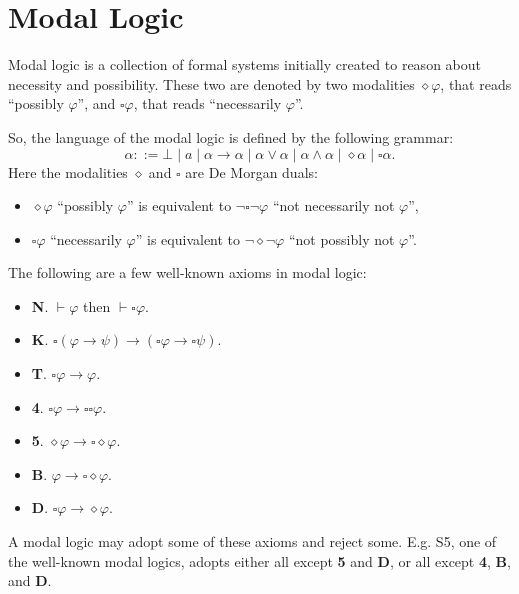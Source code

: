 \section{Modal Logic}

Modal logic is a collection of formal systems initially created to reason about necessity and possibility. These two are denoted by two modalities $\diamond\varphi$, that reads ``possibly $\varphi$'', and $\square\varphi$, that reads ``necessarily $\varphi$''.

So, the language of the modal logic is defined by the following grammar:
\[
\alpha ::= \bot \mid a \mid \alpha \rightarrow \alpha \mid \alpha \vee \alpha \mid \alpha \wedge \alpha \mid \diamond\alpha \mid \square\alpha.
\]
Here the modalities $\diamond$ and $\square$ are De Morgan duals:
\begin{itemize}
    \item $\diamond\varphi$ ``possibly $\varphi$'' is equivalent to $\neg\square\neg\varphi$ ``not necessarily not $\varphi$'',
    \item $\square\varphi$ ``necessarily $\varphi$'' is equivalent to $\neg\diamond\neg\varphi$ ``not possibly not $\varphi$''.
\end{itemize}

The following are a few well-known axioms in modal logic:
\begin{itemize}
    \item \textbf{N}. $\vdash \varphi$ then $\vdash \square\varphi$.
    \item \textbf{K}. $\square(\varphi \rightarrow \psi) \rightarrow (\square\varphi \rightarrow \square\psi)$.
    \item \textbf{T}. $\square\varphi \rightarrow \varphi$.
    \item \textbf{4}. $\square\varphi \rightarrow \square\square\varphi$.
    \item \textbf{5}. $\diamond\varphi \rightarrow \square\diamond\varphi$.
    \item \textbf{B}. $\varphi \rightarrow \square\diamond\varphi$.
    \item \textbf{D}. $\square\varphi \rightarrow \diamond\varphi$.
\end{itemize}
A modal logic may adopt some of these axioms and reject some. E.g. S5, one of the well-known modal logics, adopts either all except \textbf{5} and \textbf{D}, or all except \textbf{4}, \textbf{B}, and \textbf{D}.